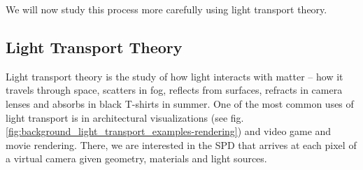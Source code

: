 We will now study this process more carefully using light transport theory.

\subsection{Light Transport Theory}
\label{section:background-projection_mapping-light_transport}

Light transport theory is the study of how light interacts with matter -- how it travels through space, scatters in fog, reflects from surfaces, refracts in camera lenses and absorbs in black T-shirts in summer. One of the most common uses of light transport is in architectural visualizations (see fig. \ref{fig:background_light_transport_examples-rendering}) and video game and movie rendering. There, we are interested in the SPD that arrives at each pixel of a virtual camera given geometry, materials and light sources.

